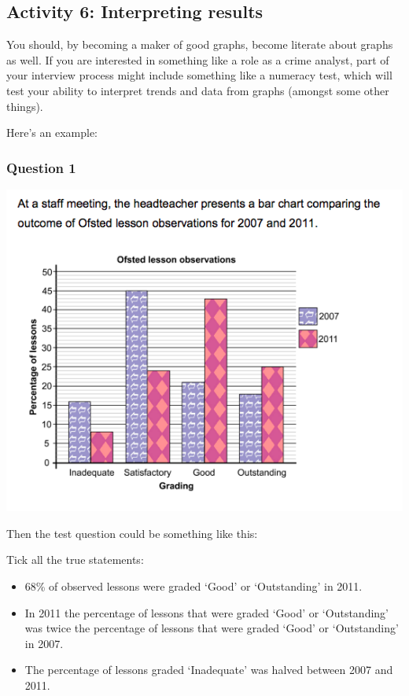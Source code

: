 \documentclass[]{book}
\providecommand{\tightlist}{%
  \setlength{\itemsep}{0pt}\setlength{\parskip}{0pt}}
\theoremstyle{definition}
\theoremstyle{definition}
\theoremstyle{definition}
\theoremstyle{remark}
\begin{document}
\hypertarget{activity-6-interpreting-results}{%
\subsection{Activity 6: Interpreting
results}\label{activity-6-interpreting-results}}

You should, by becoming a maker of good graphs, become literate about
graphs as well. If you are interested in something like a role as a
crime analyst, part of your interview process might include something
like a numeracy test, which will test your ability to interpret trends
and data from graphs (amongst some other things).

 Here's an example:

\hypertarget{question-1}{%
\subsubsection*{Question 1}\label{question-1}}

\includegraphics{imgs/numtest_1.png}

Then the test question could be something like this:

Tick all the true statements:

\begin{itemize}
\tightlist
\item
  68\% of observed lessons were graded `Good' or `Outstanding' in 2011.
\item
  In 2011 the percentage of lessons that were graded `Good' or
  `Outstanding' was twice the percentage of lessons that were graded
  `Good' or `Outstanding' in 2007.
\item
  The percentage of lessons graded `Inadequate' was halved between 2007
  and 2011.
\end{itemize}
\end{document}
